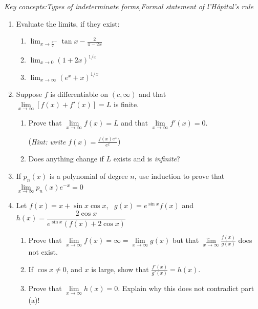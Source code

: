 \begin{exercises}
	\emph{Key concepts:\quad Types of indeterminate forms,\quad Formal statement of l'Hôpital's rule}
	
	\begin{enumerate}
	  \item Evaluate the limits, if they exist:
	  \begin{enumerate}
	    \item {}
	    $\displaystyle\lim_{x\to {\frac\pi 2}^-}\tan x-\frac 2{\pi-2x}$
	    \setcounter{enumii}{2}
	    \item {}
	    $\displaystyle\lim_{x\to 0}(1+2x)^{1/x}$
	    \setcounter{enumii}{4}
	    \item $\displaystyle\lim_{x\to \infty}(e^x+x)^{1/x}$
	  \end{enumerate}
	  	
	  	
		\item Suppose $f$ is differentiable on $(c,\infty)$ and that $\lim\limits_{x\to\infty}[f(x)+f'(x)]=L$ is finite.
		\begin{enumerate}
		  \item Prove that $\lim\limits_{x\to\infty}f(x)=L$ and that $\lim\limits_{x\to\infty}f'(x)=0$.\par
			(\emph{Hint: write $f(x)=\frac{f(x)e^x}{e^x}$})
			
			\item Does anything change if $L$ exists and is \emph{infinite}?
		\end{enumerate}
		
		
		\item\label{exs:pnexplimit} If $p_n(x)$ is a polynomial of degree $n$, use induction to prove that $\lim\limits_{x\to\infty}p_n(x)e^{-x}=0$
		
		
		\item Let $f(x)=x+\sin x\cos x$, \ $g(x)=e^{\sin x}f(x)$ and $h(x)=\dfrac{2\cos x}{e^{\sin x}(f(x)+2\cos x)}$
		\begin{enumerate}
		  \item Prove that $\lim\limits_{x\to\infty}f(x)=\infty=\lim\limits_{x\to\infty}g(x)$ but that $\lim\limits_{x\to\infty}\frac{f(x)}{g(x)}$ does not exist.
		  
		  \item If $\cos x\neq 0$, and $x$ is large, show that $\frac{f'(x)}{g'(x)}=h(x)$.
		  
		  \item Prove that $\lim\limits_{x\to\infty}h(x)=0$. Explain why this does not contradict part (a)!
		\end{enumerate}
	\end{enumerate}
\end{exercises}


